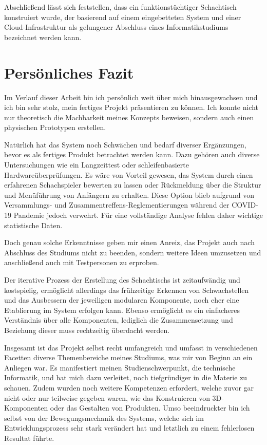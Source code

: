 Abschließend lässt sich feststellen, dass ein funktionstüchtiger
Schachtisch konstruiert wurde, der basierend auf einem eingebetteten
System und einer Cloud-Infrastruktur als gelungener Abschluss eines
Informatikstudiums bezeichnet werden kann.

\hypertarget{persuxf6nliches-fazit}{%
\section{Persönliches Fazit}\label{persuxf6nliches-fazit}}

Im Verlauf dieser Arbeit bin ich persönlich weit über mich
hinausgewachsen und ich bin sehr stolz, mein fertiges Projekt
präsentieren zu können. Ich konnte nicht nur theoretisch die Machbarkeit
meines Konzepts beweisen, sondern auch einen physischen Prototypen
erstellen.

Natürlich hat das System noch Schwächen und bedarf diverser Ergänzungen,
bevor es als fertiges Produkt betrachtet werden kann. Dazu gehören auch
diverse Untersuchungen wie ein Langzeittest oder schleifenbasierte
Hardwareüberprüfungen. Es wäre von Vorteil gewesen, das System durch
einen erfahrenen Schachspieler bewerten zu lassen oder Rückmeldung über
die Struktur und Menüführung von Anfängern zu erhalten. Diese Option
blieb aufgrund von Versammlungs- und Zusammentreffens-Reglementierungen
während der COVID-19 Pandemie jedoch verwehrt. Für eine vollständige
Analyse fehlen daher wichtige statistische Daten.

Doch genau solche Erkenntnisse geben mir einen Anreiz, das Projekt auch
nach Abschluss des Studiums nicht zu beenden, sondern weitere Ideen
umzusetzen und anschließend auch mit Testpersonen zu erproben.

Der iterative Prozess der Erstellung des Schachtischs ist zeitaufwändig
und kostspielig, ermöglicht allerdings das frühzeitige Erkennen von
Schwachstellen und das Ausbessern der jeweiligen modularen Komponente,
noch eher eine Etablierung im System erfolgen kann. Ebenso ermöglicht es
ein einfacheres Verständnis über alle Komponenten, lediglich die
Zusammensetzung und Beziehung dieser muss rechtzeitig überdacht werden.

Insgesamt ist das Projekt selbst recht umfangreich und umfasst in
verschiedenen Facetten diverse Themenbereiche meines Studiums, was mir
von Beginn an ein Anliegen war. Es manifestiert meinen
Studienschwerpunkt, die technische Informatik, und hat mich dazu
verleitet, noch tiefgründiger in die Materie zu schauen. Zudem wurden
noch weitere Kompetenzen erfordert, welche zuvor gar nicht oder nur
teilweise gegeben waren, wie das Konstruieren von 3D-Komponenten oder
das Gestalten von Produkten. Umso beeindruckter bin ich selbst von der
Bewegungsmechanik des Systems, welche sich im Entwicklungsprozess sehr
stark verändert hat und letztlich zu einem fehlerlosen Resultat führte.

